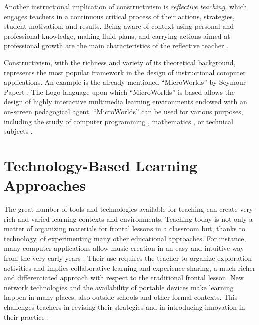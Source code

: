 \documentclass[10pt,journal,compsoc]{IEEEtran}
\begin{document}
Another instructional implication of constructivism is \textit{reflective teaching}, which engages teachers in a continuous critical process of their actions, strategies, student motivation, and results. Being aware of context using personal and professional knowledge, making fluid plans, and carrying actions aimed at professional growth are the main characteristics of the reflective teacher \cite{savage2006teaching}. 

Constructivism, with the richness and variety of its theoretical background, represents the most popular framework in the design of instructional computer applications. An example is the already mentioned ``MicroWorlds'' by Seymour Papert \cite{papert1999logo}. The Logo language upon which ``MicroWorlds'' is based allows the design of highly interactive multimedia learning environments endowed with an on-screen pedagogical agent. ``MicroWorlds'' can be used for various purposes, including the study of computer programming \cite{mcnerney2004turtles}, mathematics \cite{hoyles1992pedagogy}, or technical subjects \cite{mayer2003multimedia}. 



\section{Technology-Based Learning Approaches}
\label{sec:lrnappr}

The great number of tools and technologies available for teaching can create very rich and varied learning contexts and environments. Teaching today is not only a matter of organizing materials for frontal lessons in a classroom but, thanks to technology, of experimenting many other educational approaches. For instance, many computer applications allow music creation in an easy and intuitive way from the very early years \cite{farbood2004hyperscore, jennings2007composing, mcdowall2003music}. Their use requires the teacher to organize exploration activities and implies collaborative learning and experience sharing, a much richer and differentiated approach with respect to the traditional frontal lesson. 
New network technologies and the availability of portable devices make learning happen in many places, also outside schools and other formal contexts. This challenges teachers in revising their strategies and in introducing innovation in their practice \cite{de2014learning}. 
\end{document}
